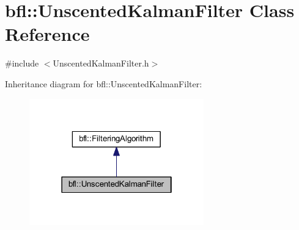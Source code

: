 \hypertarget{classbfl_1_1UnscentedKalmanFilter}{}\section{bfl\+:\+:Unscented\+Kalman\+Filter Class Reference}
\label{classbfl_1_1UnscentedKalmanFilter}


{\ttfamily \#include $<$Unscented\+Kalman\+Filter.\+h$>$}



Inheritance diagram for bfl\+:\+:Unscented\+Kalman\+Filter\+:
\nopagebreak
\begin{figure}[H]
\begin{center}
\leavevmode
\includegraphics[width=214pt]{classbfl_1_1UnscentedKalmanFilter__inherit__graph}
\end{center}
\end{figure}
